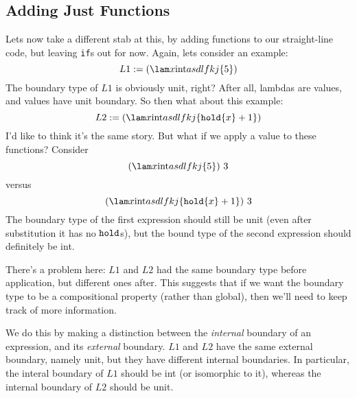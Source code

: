 \documentclass[]{article}
\newcommand {\next}{asdlfkj}
\begin{document}
\begin{abstrsyn}
\section{Adding Just Functions}

Lets now take a different stab at this, by adding functions to our straight-line code,
but leaving \texttt{if}s out for now.
Again, lets consider an example:
\[
L1 := (\lam x \rmint {\next\{5\}})
\]
The boundary type of $L1$ is obviously unit, right?
After all, lambdas are values, and values have unit boundary.
So then what about this example:
\[
L2 := (\lam x \rmint {\next\{\pause\{x\}+1\}})
\]
I'd like to think it's the same story.
But what if we apply a value to these functions?
Consider
\[
(\lam x \rmint {\next\{5\}})~3
\]
versus
\[
(\lam x \rmint {\next\{\pause\{x\}+1\}})~3
\]
The boundary type of the first expression should still be unit 
(even after substitution it has no ${\tt hold}$s),
but the bound type of the second expression should definitely be int.

There's a problem here: $L1$ and $L2$ had the same boundary type before application, but different ones after.
This suggests that if we want the boundary type to be a compositional property (rather than global),
then we'll need to keep track of more information.

We do this by making a distinction between the {\em internal} boundary of an expression,
and its {\em external} boundary.  
$L1$ and $L2$ have the same external boundary, namely unit,
but they have different internal boundaries.  
In particular, the interal boundary of $L1$ should be int (or isomorphic to it), 
whereas the internal boundary of $L2$ should be unit.




\end{abstrsyn}
\end{document}
